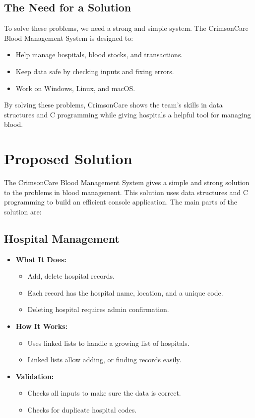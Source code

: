 \documentclass[12pt,a4paper]{report}
\begin{document}
\subsection{The Need for a Solution}
To solve these problems, we need a strong and simple system. The CrimsonCare Blood Management System is designed to:
\begin{itemize}
    \item Help manage hospitals, blood stocks, and transactions.
    \item Keep data safe by checking inputs and fixing errors.
    \item Work on Windows, Linux, and macOS.\
\end{itemize}

By solving these problems, CrimsonCare shows the team's skills in data structures
and C programming while giving hospitals a helpful tool for managing blood.

\section{Proposed Solution}
The CrimsonCare Blood Management System gives a simple and strong solution to the
problems in blood management. This solution uses data structures and C programming
to build an efficient console application. The main parts of the solution are:

\subsection{Hospital Management}
\begin{itemize}
    \item \normalsize \textbf{What It Does:}
    \begin{itemize}
        \item Add, delete hospital records.
        \item Each record has the hospital name, location, and a unique code.
        \item Deleting hospital requires admin confirmation.
    \end{itemize}
    \item \normalsize \textbf{How It Works:}
    \begin{itemize}
        \item Uses linked lists to handle a growing list of hospitals.
        \item Linked lists allow adding, or finding records easily.
    \end{itemize}
    \item \normalsize \textbf{Validation:}
    \begin{itemize}
        \item Checks all inputs to make sure the data is correct.
        \item Checks for duplicate hospital codes.
    \end{itemize}
\end{itemize}
\end{document}
